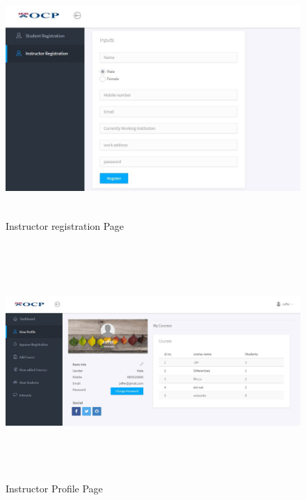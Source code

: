 \begin{figure}[!h]
	\begin{center}
		\includegraphics[height=9cm,width=15cm]{instructorreg.jpg}
	\end{center}
\caption{Instructor registration Page}
\end{figure}

\begin{figure}[!h]
	\begin{center}
		\includegraphics[height=9cm,width=15cm]{instructorprofile.jpg}
	\end{center}
\caption{Instructor Profile Page}
\end{figure}

